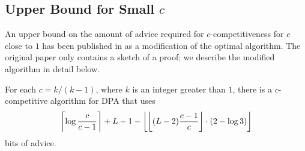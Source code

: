 \subsection{Upper Bound for Small $c$}

An upper bound on the amount of advice required for $c$-competitiveness
for $c$ close to $1$ has been published in \cite{sofsem2014} as a
modification of the optimal algorithm. The original paper only contains a
sketch of a proof; we describe the modified algorithm in detail below.

\begin{theorem}\label{theorem:dpa-log3}
    For each $c = k/(k-1)$, where $k$ is an integer greater than $1$,
    there is a $c$-competitive algorithm for DPA that uses
    $$\ceil*{\log\frac{c}{c-1}} + L-1 -
    \floor*{\floor*{(L-2)\frac{c-1}{c}} \cdot (2 - \log 3)}$$
    bits of advice.
\end{theorem}

